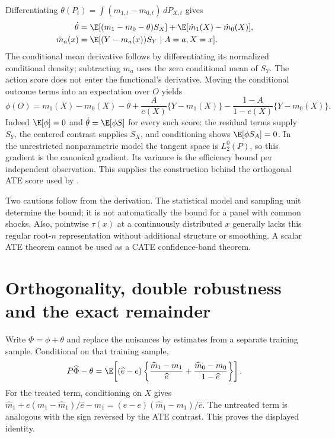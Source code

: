 Differentiating $\theta(P_t)=\int(m_{1,t}-m_{0,t})\,dP_{X,t}$ gives
\begin{align}
 \dot\theta
 &=\E[(m_1-m_0-\theta)S_X]
   +\E[\dot m_1(X)-\dot m_0(X)],\nonumber\\
 \dot m_a(x)
 &=\E[(Y-m_a(x))S_Y\mid A=a,X=x].
 \label{r3:path-derivative}
\end{align}
The conditional mean derivative follows by differentiating its normalized
conditional density; subtracting $m_a$ uses the zero conditional mean
of $S_Y$. The action score does not enter the functional's derivative.
Moving the conditional outcome terms into an expectation over $O$ yields
\begin{equation}
 \phi(O)=m_1(X)-m_0(X)-\theta
       +\frac{A}{e(X)}\{Y-m_1(X)\}
       -\frac{1-A}{1-e(X)}\{Y-m_0(X)\}.
 \label{r3:eif}
\end{equation}
Indeed $\E[\phi]=0$ and $\dot\theta=\E[\phi S]$ for every such score:
the residual terms supply $S_Y$, the centered contrast supplies $S_X$,
and conditioning shows $\E[\phi S_A]=0$. In the unrestricted
nonparametric model the tangent space is $L_2^0(P)$, so this gradient is
the canonical gradient. Its variance is the efficiency bound per
independent observation. This supplies the construction behind the
orthogonal ATE score used by
\citet[Section 5.1, Equation (5.3)]{dml2018}.

Two cautions follow from the derivation. The statistical model and sampling
unit determine the bound; it is not automatically the bound for a panel
with common shocks. Also, pointwise $\tau(x)$ at a continuously distributed
$x$ generally lacks this regular root-$n$ representation without additional
structure or smoothing. A scalar ATE theorem cannot be used as a CATE
confidence-band theorem.

\section{Orthogonality, double robustness and the exact remainder}
\label{r3:ml-remainder}
Write $\Phi=\phi+\theta$ and replace the nuisances by estimates from
a separate training sample. Conditional on that training sample,
\begin{equation}
 P\widehat\Phi-\theta
 =\E\!\left[(\widehat e-e)
       \left\{\frac{\widehat m_1-m_1}{\widehat e}
             +\frac{\widehat m_0-m_0}{1-\widehat e}\right\}\right].
 \label{r3:exact-remainder}
\end{equation}
For the treated term, conditioning on $X$ gives
$\widehat m_1+e(m_1-\widehat m_1)/\widehat e-m_1
=(\widehat e-e)(\widehat m_1-m_1)/\widehat e$.
The untreated term is analogous with the sign reversed by the ATE
contrast. This proves the displayed identity.

